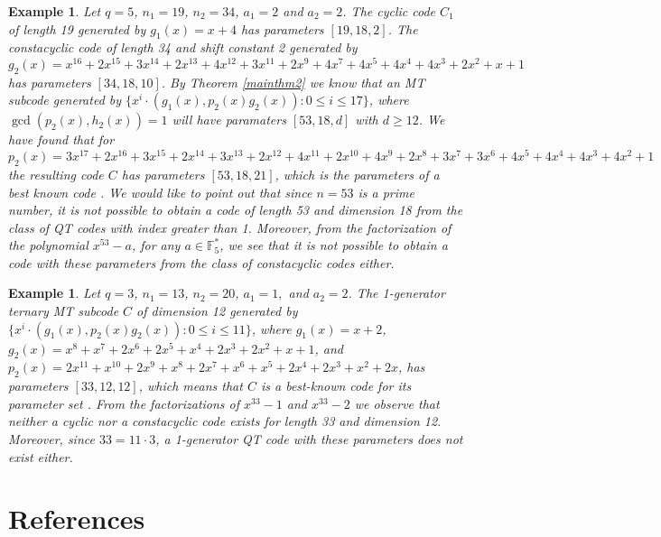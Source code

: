 \documentclass[preprint,12pt]{elsarticle}
\newtheorem{Example}[Theorem]{Example}
\begin{document}
\begin{Example}
Let $q=5$, $n_1=19$, $n_2=34$, $a_1=2$ and $a_2=2$. The cyclic code $C_1$ of length 19 generated by 
$g_1(x)=x+4$ has parameters $[19, 18, 2]$. The constacyclic code of length 34 and shift constant 2 generated by $g_2(x)= x^{16} + 2x^{15} + 3x^{14} + 2x^{13} + 4x^{12} + 3x^{11} + 2x^9 + 4x^7 + 4x^5 + 4x^4 + 4x^3 + 2x^2 + x + 1$ has parameters $[34, 18, 10]$. By Theorem \ref{mainthm2} we know that an MT subcode generated by $\{x^i\cdot (g_1(x),p_2(x)g_2(x)): 0\leq i\leq 17\}$, where $\gcd(p_2(x),h_2(x))=1$ will have paramaters $[53,18,d]$ with $d\geq 12$.  We have found that for $p_2(x) =3x^{17} + 2x^{16} + 3x^{15} + 2x^{14} + 3x^{13} + 2x^{12} + 4x^{11} + 2x^{10} + 4x^9 + 2x^8 + 3x^7 + 3x^6 + 4x^5 + 4x^4 + 4x^3 + 4x^2 + 1$ the resulting code $C$ has parameters $[53, 18, 21]$, which is the parameters of a best known code \cite{table}. We would like to point out that since $n=53$ is a prime number, it is not possible to obtain a code of length 53 and dimension 18 from the class of QT codes with index greater than 1. Moreover, from the factorization of the polynomial $x^{53}-a$, for any $a\in \mathbb{F}^*_5$, we see that it is not possible to obtain a code with these parameters from the class of constacyclic codes either.  
\end{Example}

\begin{Example}
Let $q=3$, $n_1=13$, $n_2=20$, $a_1=1,$ and $a_2=2$. The 1-generator ternary MT subcode $C$ of dimension 12 generated by
$\{x^i\cdot (g_1(x),p_2(x)g_2(x)): 0\leq i\leq 11\}$, where $g_1(x)=x+2$, $g_2(x)=x^8 + x^7 + 2x^6 + 2x^5 + x^4 + 2x^3 + 2x^2 + x + 1$, and $p_2(x)=2x^{11} + x^{10} + 2x^9 + x^8 + 2x^7 + x^6 + x^5 + 2x^4 + 2x^3 + x^2 + 2x$, has parameters $[33,12,12]$, which means that $C$ is a best-known code for its parameter set \cite{table}. From the factorizations of $x^{33}-1$ and $x^{33}-2$ we observe that neither a cyclic nor a constacyclic code exists for length 33 and dimension 12. Moreover, since $33=11\cdot 3$, a 1-generator QT code with these parameters does not exist either. 

\end{Example}



\section*{References}
\end{document}
